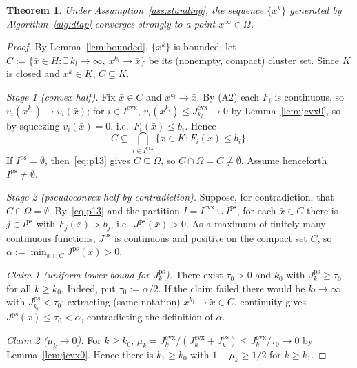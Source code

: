 \documentclass[]{interact}
\theoremstyle{plain}
\newtheorem{theorem}{Theorem}[section]
\theoremstyle{definition}
\theoremstyle{remark}
\newcommand{\cvx}{\mathrm{cvx}}
\newcommand{\ps}{\mathrm{ps}}
\begin{document}
\begin{theorem}\label{thm:strong}
Under Assumption~\ref{ass:standing}, the sequence $\{x^k\}$ generated by
Algorithm~\ref{alg:dtap} converges strongly to a point $x^\infty\in\Omega$.
\end{theorem}
\begin{proof}
By Lemma~\ref{lem:bounded}, $\{x^k\}$ is bounded; let
$C:=\{\bar x\in H:\exists\,k_l\to\infty,\ x^{k_l}\to\bar x\}$ be its (nonempty, compact)
cluster set. Since $K$ is closed and $x^k\in K$, $C\subseteq K$.

\emph{Stage 1 (convex half).} Fix $\bar x\in C$ and $x^{k_l}\to\bar x$. By (A2) each
$F_i$ is continuous, so $v_i(x^{k_l})\to v_i(\bar x)$; for $i\in I^{\cvx}$,
$v_i(x^{k_l})\le J^{\cvx}_{k_l}\to0$ by Lemma~\ref{lem:jcvx0}, so by squeezing
$v_i(\bar x)=0$, i.e.\ $F_i(\bar x)\le b_i$. Hence
\begin{equation}\label{eq:p13}
C\subseteq\bigcap_{i\in I^{\cvx}}\{x\in K:F_i(x)\le b_i\}.
\end{equation}
If $I^{\ps}=\emptyset$, then~\eqref{eq:p13} gives $C\subseteq\Omega$,
so $C\cap\Omega=C\ne\emptyset$.
Assume henceforth $I^{\ps}\ne\emptyset$.

\emph{Stage 2 (pseudoconvex half by contradiction).} Suppose, for contradiction, that
$C\cap\Omega=\emptyset$. By~\eqref{eq:p13} and the partition $I=I^{\cvx}\cup I^{\ps}$, for
each $\bar x\in C$ there is $j\in I^{\ps}$ with $F_j(\bar x)>b_j$, i.e.\
$J^{\ps}(\bar x)>0$. As a maximum of finitely many continuous functions, $J^{\ps}$ is
continuous and positive on the compact set $C$, so $\alpha:=\min_{x\in C}J^{\ps}(x)>0$.

\smallskip
\emph{Claim 1 (uniform lower bound for $J^{\ps}_k$).} There exist $\tau_0>0$ and $k_0$
with $J^{\ps}_k\ge\tau_0$ for all $k\ge k_0$. Indeed, put $\tau_0:=\alpha/2$. If the claim
failed there would be $k_l\to\infty$ with $J^{\ps}_{k_l}<\tau_0$; extracting (same
notation) $x^{k_l}\to\tilde x\in C$, continuity gives $J^{\ps}(\tilde x)\le\tau_0<\alpha$,
contradicting the definition of $\alpha$.

\smallskip
\emph{Claim 2 ($\mu_k\to0$).} For $k\ge k_0$,
$\mu_k=J^{\cvx}_k/(J^{\cvx}_k+J^{\ps}_k)\le J^{\cvx}_k/\tau_0\to0$ by
Lemma~\ref{lem:jcvx0}. Hence there is $k_1\ge k_0$ with $1-\mu_k\ge1/2$ for $k\ge k_1$.


\end{proof}
\end{document}
